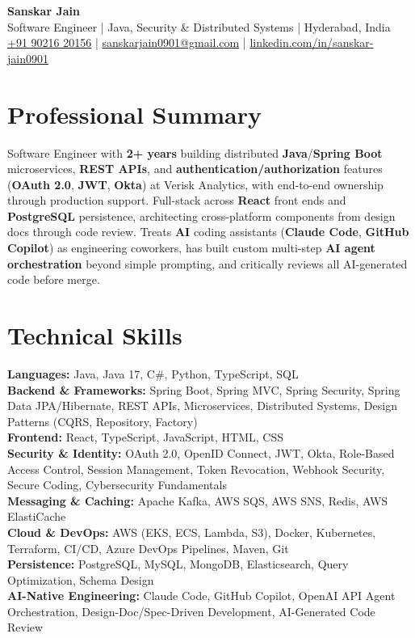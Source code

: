 \documentclass[a4paper,10pt]{article}
\begin{document}
\begin{center}
    {\LARGE \textbf{Sanskar Jain}} \\
    \vspace{2pt}
    Software Engineer \;|\; Java, Security \& Distributed Systems \;|\; Hyderabad, India \\
    \href{tel:+919021620156}{+91 90216 20156} \;|\;
    \href{mailto:sanskarjain0901@gmail.com}{sanskarjain0901@gmail.com} \;|\;
    \href{https://www.linkedin.com/in/sanskar-jain0901/}{linkedin.com/in/sanskar-jain0901}
\end{center}

\section*{Professional Summary}
Software Engineer with \textbf{2+ years} building distributed \textbf{Java}/\textbf{Spring Boot} microservices, \textbf{REST APIs}, and \textbf{authentication/authorization} features (\textbf{OAuth 2.0}, \textbf{JWT}, \textbf{Okta}) at Verisk Analytics, with end-to-end ownership through production support.
Full-stack across \textbf{React} front ends and \textbf{PostgreSQL} persistence, architecting cross-platform components from design docs through code review.
Treats \textbf{AI} coding assistants (\textbf{Claude Code}, \textbf{GitHub Copilot}) as engineering coworkers, has built custom multi-step \textbf{AI agent orchestration} beyond simple prompting, and critically reviews all AI-generated code before merge.

\section*{Technical Skills}
\begin{sloppypar}
\noindent
\textbf{Languages:} Java, Java 17, C\#, Python, TypeScript, SQL \\
\textbf{Backend \& Frameworks:} Spring Boot, Spring MVC, Spring Security, Spring Data JPA/Hibernate, REST APIs, Microservices, Distributed Systems, Design Patterns (CQRS, Repository, Factory) \\
\textbf{Frontend:} React, TypeScript, JavaScript, HTML, CSS \\
\textbf{Security \& Identity:} OAuth 2.0, OpenID Connect, JWT, Okta, Role-Based Access Control, Session Management, Token Revocation, Webhook Security, Secure Coding, Cybersecurity Fundamentals \\
\textbf{Messaging \& Caching:} Apache Kafka, AWS SQS, AWS SNS, Redis, AWS ElastiCache \\
\textbf{Cloud \& DevOps:} AWS (EKS, ECS, Lambda, S3), Docker, Kubernetes, Terraform, CI/CD, Azure DevOps Pipelines, Maven, Git \\
\textbf{Persistence:} PostgreSQL, MySQL, MongoDB, Elasticsearch, Query Optimization, Schema Design \\
\textbf{AI-Native Engineering:} Claude Code, GitHub Copilot, OpenAI API Agent Orchestration, Design-Doc/Spec-Driven Development, AI-Generated Code Review
\end{sloppypar}
\end{document}
